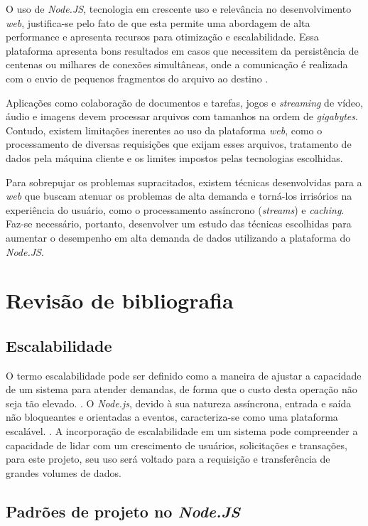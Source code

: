 \documentclass[12pt]{article}
\begin{document}
O uso de \textit{Node.JS}, tecnologia em crescente uso e relevância no
desenvolvimento \textit{web}, justifica-se pelo fato de que esta permite uma abordagem de alta
performance e apresenta recursos para otimização e escalabilidade. Essa plataforma apresenta
bons resultados em casos que necessitem da persistência de centenas ou milhares de conexões
simultâneas, onde a comunicação é realizada com o envio de pequenos fragmentos do arquivo ao destino
\cite[p. 112]{EJSMONT}.

Aplicações como colaboração de documentos e tarefas, jogos e \textit{streaming} de vídeo, áudio e imagens
\cite{ZRHR} devem processar arquivos com tamanhos na ordem de \textit{gigabytes}. 
Contudo, existem limitações inerentes ao uso da plataforma \textit{web}, como o processamento de 
diversas requisições que exijam esses arquivos, tratamento de dados pela máquina 
cliente e os limites impostos pelas tecnologias escolhidas.

Para sobrepujar os problemas supracitados, existem técnicas desenvolvidas para a \textit{web} que buscam
atenuar os problemas de alta demanda e torná-los irrisórios na experiência do usuário, como o processamento
assíncrono (\textit{streams}) e \textit{caching}. Faz-se necessário, portanto, desenvolver um estudo das 
técnicas escolhidas para aumentar o desempenho em alta demanda de dados utilizando a plataforma do \textit{Node.JS}.


\section{Revisão de bibliografia}

\subsection{Escalabilidade}

O termo escalabilidade pode ser definido como a maneira de ajustar a
capacidade de um sistema para atender demandas, de forma que o custo desta
operação não seja tão elevado. \cite[p. 3]{EJSMONT}. O \textit{Node.js}, devido à sua natureza
assíncrona, entrada e saída não bloqueantes e orientadas a eventos, caracteriza-se como
uma plataforma escalável. \cite[p. 2]{SCALABILITY}. A incorporação de escalabilidade
em um sistema pode compreender a capacidade de lidar com um crescimento de usuários, solicitações
e transações, para este projeto, seu uso será voltado para a requisição e transferência de grandes volumes de dados.


\subsection{Padrões de projeto no \textit{Node.JS}}
\end{document}

